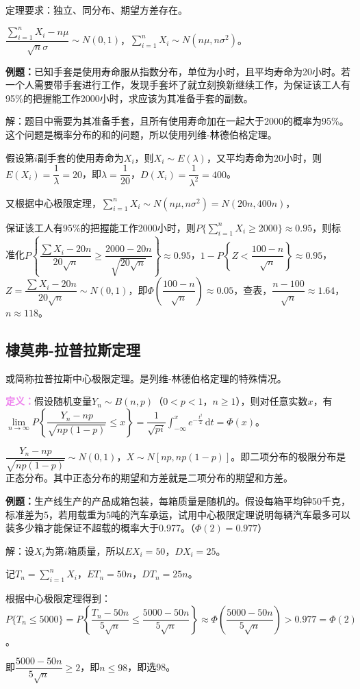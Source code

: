 定理要求：独立、同分布、期望方差存在。

$\dfrac{\sum\limits_{i=1}^nX_i-n\mu}{\sqrt{n}\sigma}\sim N(0,1)$，$\sum\limits_{i=1}^nX_i\sim N(n\mu,n\sigma^2)$。

\textbf{例题：}已知手套是使用寿命服从指数分布，单位为小时，且平均寿命为20小时。若一个人需要带手套进行工作，发现手套坏了就立刻换新继续工作，为保证该工人有95\%的把握能工作2000小时，求应该为其准备手套的副数。

解：题目中需要为其准备手套，且所有使用寿命加在一起大于2000的概率为95\%。这个问题是概率分布的和的问题，所以使用列维-林德伯格定理。

假设第$i$副手套的使用寿命为$X_i$，则$X_i\sim E(\lambda)$，又平均寿命为$20$小时，则$E(X_i)=\dfrac{1}{\lambda}=20$，即$\lambda=\dfrac{1}{20}$，$D(X_i)=\dfrac{1}{\lambda^2}=400$。

又根据中心极限定理，$\sum\limits_{i=1}^nX_i\sim N(n\mu,n\sigma^2)=N(20n,400n)$，

保证该工人有95\%的把握能工作2000小时，则$P\{\sum\limits_{i=1}^nX_i\geqslant2000\}\approx0.95$，则标准化$P\left\{\dfrac{\sum X_i-20n}{20\sqrt{n}}\geqslant\dfrac{2000-20n}{\sqrt{20\sqrt{n}}}\right\}\approx0.95$，$1-P\left\{Z<\dfrac{100-n}{\sqrt{n}}\right\}\approx0.95$，$Z=\dfrac{\sum X_i-20n}{20\sqrt{n}}\sim N(0,1)$，即$\varPhi(\dfrac{100-n}{\sqrt{n}})\approx0.05$，查表，$\dfrac{n-100}{\sqrt{n}}\approx1.64$，$n\approx118$。

\subsection{棣莫弗-拉普拉斯定理}

或简称拉普拉斯中心极限定理。是列维-林德伯格定理的特殊情况。

\textcolor{violet}{\textbf{定义：}}假设随机变量$Y_n\sim B(n,p)$（$0<p<1$，$n\geqslant1$），则对任意实数$x$，有$\lim\limits_{n\to\infty}P\left\{\dfrac{Y_n-np}{\sqrt{np(1-p)}}\leqslant x\right\}=\dfrac{1}{\sqrt{pi}}\int_{-\infty}^xe^{-\frac{t^2}{2}}\,\textrm{d}t=\varPhi(x)$。\medskip

$\dfrac{Y_n-np}{\sqrt{np(1-p)}}\sim N(0,1)$，$X\sim N[np,np(1-p)]$。即二项分布的极限分布是正态分布。其中正态分布的期望和方差就是二项分布的期望和方差。

\textbf{例题：}生产线生产的产品成箱包装，每箱质量是随机的。假设每箱平均钟50千克，标准差为5，若用载重为5吨的汽车承运，试用中心极限定理说明每辆汽车最多可以装多少箱才能保证不超载的概率大于0.977。（$\varPhi(2)=0.977$）

解：设$X_i$为第$i$箱质量，所以$EX_i=50$，$DX_i=25$。

记$T_n=\sum\limits_{i=1}^nX_i$，$ET_n=50n$，$DT_n=25n$。

根据中心极限定理得到：$P\{T_n\leqslant5000\}=P\left\{\dfrac{T_n-50n}{5\sqrt{n}}\leqslant\dfrac{5000-50n}{5\sqrt{n}}\right\}\approx\varPhi\left(\dfrac{5000-50n}{5\sqrt{n}}\right)>0.977=\varPhi(2)$。

即$\dfrac{5000-50n}{5\sqrt{n}}\geqslant2$，即$n\leqslant98$，即选98。

%
